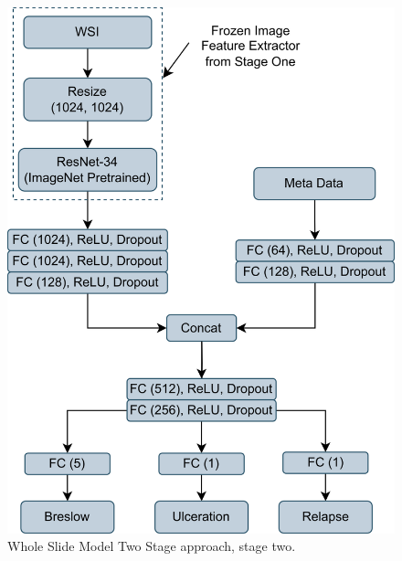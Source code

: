\documentclass[conference]{IEEEtran}
\begin{document}
\begin{figure}[h!]
  \centering
    \includegraphics[scale=0.5]{images/page2.png}
  \caption{Whole Slide Model Two Stage approach, stage two.}
  \label{fig:wsi_s2}
\end{figure}
\end{document}
